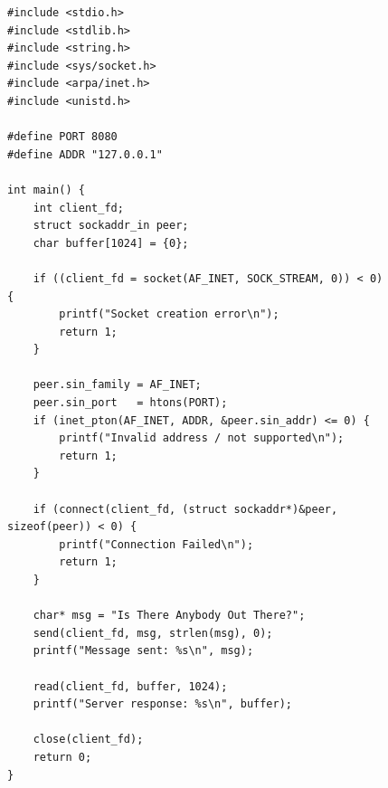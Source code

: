 \documentclass[a4paper,14pt]{extarticle}
\begin{document}
\begin{figure}[!htb]
\begin{lstlisting}[caption={\texttt{tcp_client.c}},label={lst:client}]
#include <stdio.h>
#include <stdlib.h>
#include <string.h>
#include <sys/socket.h>
#include <arpa/inet.h>
#include <unistd.h>

#define PORT 8080
#define ADDR "127.0.0.1"

int main() {
    int client_fd;
    struct sockaddr_in peer;
    char buffer[1024] = {0};

    if ((client_fd = socket(AF_INET, SOCK_STREAM, 0)) < 0) {
        printf("Socket creation error\n");
        return 1;
    }

    peer.sin_family = AF_INET;
    peer.sin_port   = htons(PORT);
    if (inet_pton(AF_INET, ADDR, &peer.sin_addr) <= 0) {
        printf("Invalid address / not supported\n");
        return 1;
    }

    if (connect(client_fd, (struct sockaddr*)&peer, sizeof(peer)) < 0) {
        printf("Connection Failed\n");
        return 1;
    }

    char* msg = "Is There Anybody Out There?";
    send(client_fd, msg, strlen(msg), 0);
    printf("Message sent: %s\n", msg);

    read(client_fd, buffer, 1024);
    printf("Server response: %s\n", buffer);

    close(client_fd);
    return 0;
}
\end{lstlisting}
\end{figure}
\clearpage
\end{document}
